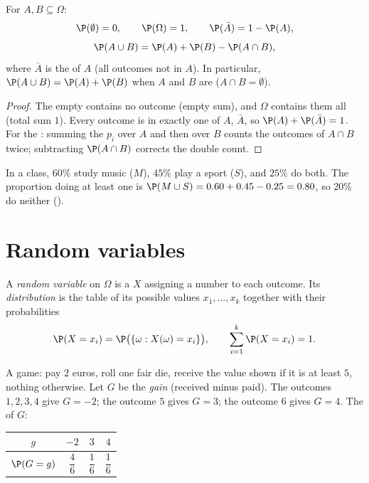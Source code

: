 \begin{proposition}\label{prop:g11:prob:rules}
For  $A, B \subseteq \Omega$:
\[
\P(\emptyset) = 0, \qquad \P(\Omega) = 1, \qquad
\P(\bar A) = 1 - \P(A),
\]
\[
\P(A \cup B) = \P(A) + \P(B) - \P(A \cap B),
\]
where $\bar A$ is the \emph{} of $A$ (all outcomes not in $A$).
In particular, $\P(A \cup B) = \P(A) + \P(B)$ when $A$ and $B$ are
\emph{} ($A \cap B = \emptyset$).
\end{proposition}

\begin{proof}
The empty  contains no outcome (empty sum), and $\Omega$ contains
them all (total sum $1$). Every outcome is in exactly one of $A$,
$\bar A$, so $\P(A) + \P(\bar A) = 1$. For the : summing the $p_i$
over $A$ and then over $B$ counts the outcomes of $A \cap B$ twice;
subtracting $\P(A \cap B)$ corrects the double count.
\end{proof}

\begin{example}
In a class, $60\%$ study music ($M$), $45\%$ play a sport ($S$), and
$25\%$ do both. The proportion doing at least one is
$\P(M \cup S) = 0.60 + 0.45 - 0.25 = 0.80$, so $20\%$ do neither
().
\end{example}

\section{Random variables}

\begin{definition}\label{def:g11:prob:rv}
A \emph{random variable} on $\Omega$ is a 
$X$ assigning a number to each outcome. Its
\emph{distribution} is the table of its possible
values $x_1, \dots, x_k$ together with their probabilities
\[
\P(X = x_i) = \P\bigl(\{\omega : X(\omega) = x_i\}\bigr),
\qquad
\sum_{i=1}^k \P(X = x_i) = 1 .
\]
\end{definition}

\begin{example}\label{ex:g11:prob:game}
A game: pay $2$ euros, roll one fair die, receive the value shown if it
is at least $5$, nothing otherwise. Let $G$ be the \emph{gain} (received
minus paid). The outcomes $1, 2, 3, 4$ give $G = -2$; the outcome $5$
gives $G = 3$; the outcome $6$ gives $G = 4$. The  of $G$:
\begin{center}
\begin{tabular}{c|ccc}
$g$ & $-2$ & $3$ & $4$\\
\hline\rule{0pt}{11pt}%
$\P(G = g)$ & $\dfrac46$ & $\dfrac16$ & $\dfrac16$
\end{tabular}
\end{center}
\end{example}

